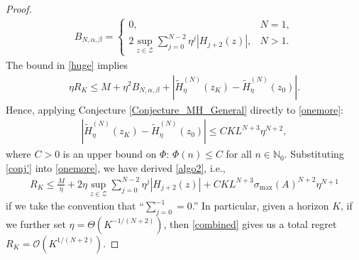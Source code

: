 \documentclass[11pt]{article}
\newcommand{\Z}{\mathcal{Z}}
\newcommand{\N}{\mathbb{N}}
\begin{document}
\begin{proof}
\begin{gather}
    B_{N,\alpha,\beta}=
    \begin{cases}
        0, & N=1,\\
        2\sup_{z\in\Z}\sum_{j=0}^{N-2}{\eta^{j}\left|H_{j+2}(z)\right|}, & N>1.
    \end{cases} \nonumber
\end{gather}
The bound in \eqref{huge} implies
\begin{gather}
    \eta R_{K}\leq M+\eta^{2}B_{N,\alpha,\beta}+\left|\widetilde{H}_{\eta}^{(N)}\left(z_{K}\right)-\widetilde{H}_{\eta}^{(N)}\left(z_{0}\right)\right|.\label{onemore}
\end{gather}
Hence, applying Conjecture \ref{Conjecture_MH_General} directly to \eqref{onemore}:
\begin{gather}
    \left|\widetilde{H}_{\eta}^{(N)}\left(z_{K}\right)-\widetilde{H}_{\eta}^{(N)}\left(z_{0}\right)\right|\leq CKL^{N+3}\eta^{N+2},\label{conj'}
\end{gather}
where $C>0$ is an upper bound on $\Phi$: $\Phi\left(n\right)\leq C$ for all $n\in\N_{0}$. Substituting \eqref{conj'} into \eqref{onemore}, we have derived \eqref{algo2}, i.e.,
\begin{gather}
R_{K}\leq \frac{M}{\eta}+2\eta\sup_{z\in\Z}\sum_{j=0}^{N-2}{\eta^{j}\left|H_{j+2}(z)\right|}+CKL^{N+3}\sigma_{\max}\left(A\right)^{N+2}\eta^{N+1}\label{combined}
\end{gather}
if we take the convention that ``$\sum_{j=0}^{-1}=0$.'' In particular, given a horizon $K$, if we further set $\boxed{\eta=\Theta\left(K^{-1/(N+2)}\right)}$, then \eqref{combined} gives us a total regret $\boxed{R_{K}=\mathcal{O}\left(K^{1/(N+2)}\right)}$. 


\end{proof}
\end{document}
